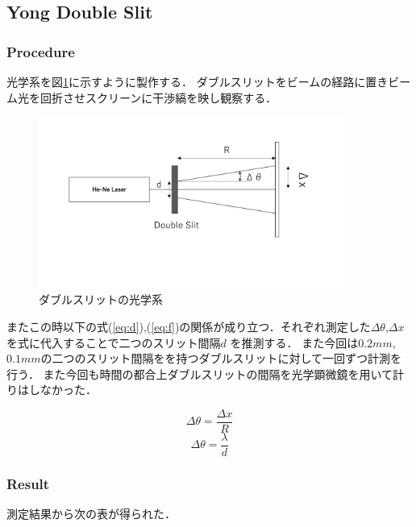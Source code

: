 \documentclass[11pt, a4paper]{jsarticle}
\begin{document}
\subsection{Yong Double Slit}
\subsubsection{Procedure}
光学系を図\ref{fig:eleven}に示すように製作する．
ダブルスリットをビームの経路に置きビーム光を回折させスクリーンに干渉縞を映し観察する．

\begin{figure}[htbp]
 \begin{center}
  \includegraphics[width=100mm]{fig11.png}
 \end{center}
 \caption{ダブルスリットの光学系}
 \label{fig:eleven}
\end{figure}

またこの時以下の式(\ref{eq:d}),(\ref{eq:f})の関係が成り立つ．それぞれ測定した$\Delta \theta$,$\Delta x$を式に代入することで二つのスリット間隔$d$
を推測する．
また今回は$0.2mm$,$0.1mm$の二つのスリット間隔をを持つダブルスリットに対して一回ずつ計測を行う．
また今回も時間の都合上ダブルスリットの間隔を光学顕微鏡を用いて計りはしなかった．

\begin{equation}
    \Delta\theta = \frac{\Delta x}{R} \label{eq:d}
\end{equation}
\begin{equation}
    \Delta\theta = \frac{\lambda}{d} \label{eq:f}
\end{equation}

\subsubsection{Result}
測定結果から次の表が得られた．
\end{document}
